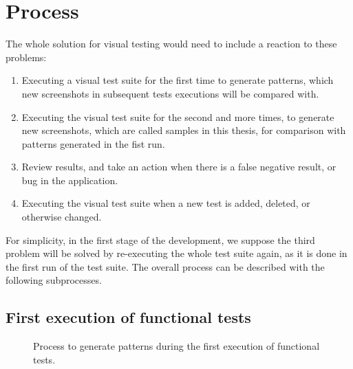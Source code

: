 \documentclass[11pt,oneside,final]{fithesis2}
\begin{document}
  \section{Process}
  \label{sec:process}
  The whole solution for visual testing would need to include a reaction to these problems:
  \begin{enumerate}
   \item Executing a visual test suite for the first time to generate patterns, which new screenshots in subsequent tests executions will be compared with.
   \item Executing the visual test suite for the second and more times, to generate new screenshots, which are called samples in this thesis, for comparison with patterns generated in the fist run.
   \item Review results, and take an action when there is a false negative result, or bug in the application.
   \item Executing the visual test suite when a new test is added, deleted, or otherwise changed.
  \end{enumerate}

  For simplicity, in the first stage of the development, we suppose the third problem will be solved by re-executing the whole test suite
  again, as it is done in the first run of the test suite. The overall process can be described with the following subprocesses.
  
  \subsection{First execution of functional tests}
  \label{chap:firstRunProc}
  
  \begin{figure}[h!]
    \begin{center}
    \leavevmode
    \centerline{}
    \end{center}
    \caption{Process to generate patterns during the first execution of functional tests.}
    \label{fig:FirstTestsRunBMPN}
  \end{figure}
  
\end{document}
